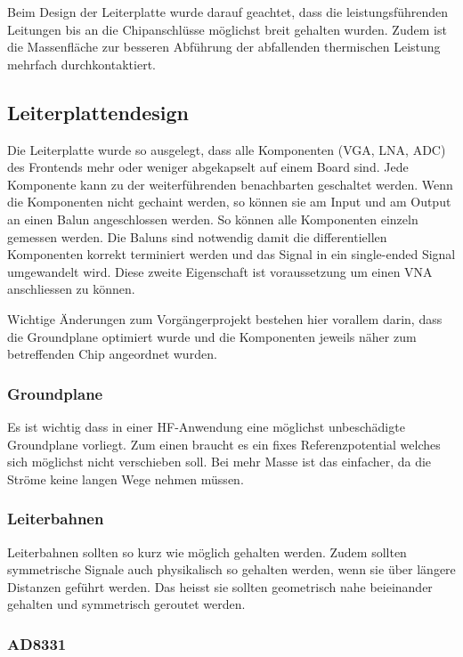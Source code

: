 Beim Design der Leiterplatte wurde darauf geachtet, dass die leistungsführenden Leitungen bis an die Chipanschlüsse möglichst breit gehalten wurden. Zudem ist die Massenfläche zur besseren Abführung der abfallenden thermischen Leistung mehrfach durchkontaktiert.

\subsection{Leiterplattendesign}

Die Leiterplatte wurde so ausgelegt, dass alle Komponenten (VGA, LNA, ADC) des Frontends mehr oder weniger abgekapselt auf einem Board sind. Jede Komponente kann zu der weiterführenden benachbarten geschaltet werden. Wenn die Komponenten nicht gechaint werden, so können sie am Input und am Output an einen Balun angeschlossen werden. So können alle Komponenten einzeln gemessen werden. Die Baluns sind notwendig damit die differentiellen Komponenten korrekt terminiert werden und das Signal in ein single-ended Signal umgewandelt wird. Diese zweite Eigenschaft ist voraussetzung um einen VNA anschliessen zu können.

Wichtige Änderungen zum Vorgängerprojekt bestehen hier vorallem darin, dass die Groundplane optimiert wurde und die Komponenten jeweils näher zum betreffenden Chip angeordnet wurden.

\subsubsection*{Groundplane}

Es ist wichtig dass in einer HF-Anwendung eine möglichst unbeschädigte Groundplane vorliegt. Zum einen braucht es ein fixes Referenzpotential welches sich möglichst nicht verschieben soll. Bei mehr Masse ist das einfacher, da die Ströme keine langen Wege nehmen müssen.

\subsubsection*{Leiterbahnen}

Leiterbahnen sollten so kurz wie möglich gehalten werden. Zudem sollten symmetrische Signale auch physikalisch so gehalten werden, wenn sie über längere Distanzen geführt werden. Das heisst sie sollten geometrisch nahe beieinander gehalten und symmetrisch geroutet werden. 

\subsubsection*{AD8331}

